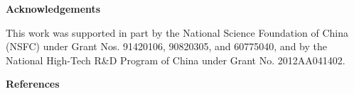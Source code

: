 \documentclass[10.5pt,compsoc]{TsT}
\theoremstyle{mystyle}
\begin{document}
{\vskip 2mm
\noindent
\textbf{Acknowledgements}
\vskip 2mm

\noindent
This work was supported in part by the National Science Foundation of China (NSFC) under Grant Nos. 91420106, 90820305, and 60775040, and by the National High-Tech R\&D Program of China under Grant No. 2012AA041402.

\vskip 2mm
\noindent
\textbf{References}
\vskip 2mm


\begin{thebibliography}{99}
 \addtolength{\itemsep}{-1em}
\vspace {1.5mm}


%
%
%


\end{thebibliography}}
\end{document}
